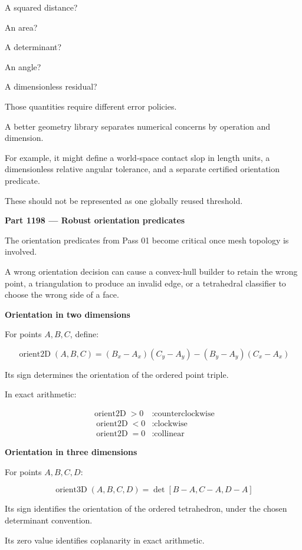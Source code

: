 A squared distance?

An area?

A determinant?

An angle?

A dimensionless residual?

Those quantities require different error policies.

A better geometry library separates numerical concerns by operation and dimension.

For example, it might define a world-space contact slop in length units, a dimensionless relative angular tolerance, and a separate certified orientation predicate.

These should not be represented as one globally reused threshold.

\textbf{Part 1198 --- Robust orientation predicates}

The orientation predicates from Pass 01 become critical once mesh topology is involved.

A wrong orientation decision can cause a convex-hull builder to retain the wrong point, a triangulation to produce an invalid edge, or a tetrahedral classifier to choose the wrong side of a face.

\textbf{Orientation in two dimensions}

For points \(A,B,C\), define:

\[
\boxed{ \operatorname{orient2D}(A,B,C)= (B_x-A_x)(C_y-A_y) - (B_y-A_y)(C_x-A_x) }
\]

Its sign determines the orientation of the ordered point triple.

In exact arithmetic:

\[
\begin{aligned} \operatorname{orient2D}>0 &: \text{counterclockwise}\\\ \operatorname{orient2D}<0 &: \text{clockwise}\\\ \operatorname{orient2D}=0 &: \text{collinear} \end{aligned}
\]

\textbf{Orientation in three dimensions}

For points \(A,B,C,D\):

\[
\boxed{ \operatorname{orient3D}(A,B,C,D)= \det[B-A,C-A,D-A] }
\]

Its sign identifies the orientation of the ordered tetrahedron, under the chosen determinant convention.

Its zero value identifies coplanarity in exact arithmetic.

